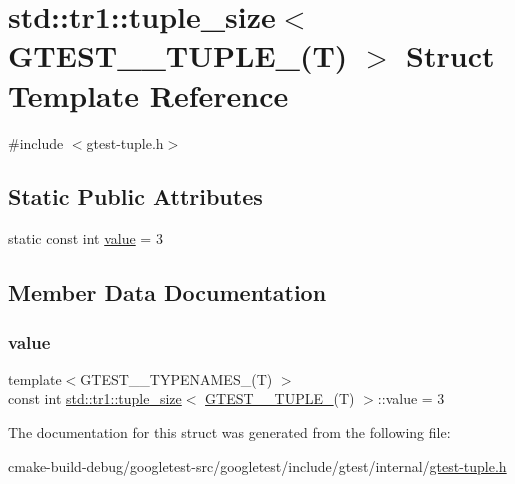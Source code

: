 \hypertarget{structstd_1_1tr1_1_1tuple__size_3_01GTEST__3__TUPLE___07T_08_01_4}{}\section{std\+::tr1\+::tuple\+\_\+size$<$ G\+T\+E\+S\+T\+\_\+\_\+\+T\+U\+P\+L\+E\+\_\+(T) $>$ Struct Template Reference}
\label{structstd_1_1tr1_1_1tuple__size_3_01GTEST__3__TUPLE___07T_08_01_4}


{\ttfamily \#include $<$gtest-\/tuple.\+h$>$}

\subsection*{Static Public Attributes}
\begin{DoxyCompactItemize}
\item 
static const int \mbox{\hyperlink{structstd_1_1tr1_1_1tuple__size_3_01GTEST__3__TUPLE___07T_08_01_4_ac1e2e7bb87bad1d33e4373b3e1af37c3}{value}} = 3
\end{DoxyCompactItemize}


\subsection{Member Data Documentation}
\mbox{\label{structstd_1_1tr1_1_1tuple__size_3_01GTEST__3__TUPLE___07T_08_01_4_ac1e2e7bb87bad1d33e4373b3e1af37c3}} 
\subsubsection{\texorpdfstring{value}{value}}
{\footnotesize\ttfamily template$<$G\+T\+E\+S\+T\+\_\+\_\+\+T\+Y\+P\+E\+N\+A\+M\+E\+S\+\_\+(\+T) $>$ \\
const int \mbox{\hyperlink{structstd_1_1tr1_1_1tuple__size}{std\+::tr1\+::tuple\+\_\+size}}$<$ \mbox{\hyperlink{namespacestd_1_1tr1_a368170c49cc7d7f130c0564bbad01205}{G\+T\+E\+S\+T\+\_\+\_\+\+T\+U\+P\+L\+E\+\_\+}}(T) $>$\+::value = 3\hspace{0.3cm}{\ttfamily [static]}}



The documentation for this struct was generated from the following file\+:\begin{DoxyCompactItemize}
\item 
cmake-\/build-\/debug/googletest-\/src/googletest/include/gtest/internal/\mbox{\hyperlink{gtest-tuple_8h}{gtest-\/tuple.\+h}}\end{DoxyCompactItemize}
